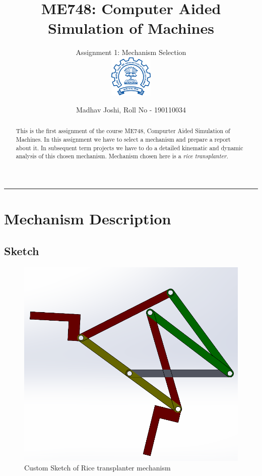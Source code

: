 \documentclass[a4paper,latin,center,onecolumn]{paper}
\title{ME748: Computer Aided Simulation of Machines}
\subtitle{Assignment 1: Mechanism Selection \\
\hfill\includegraphics[height=2cm]{Images/Indian_Institute_of_Technology_Bombay_Logo.png}
\vspace{-2cm}}
\author{Madhav Joshi, Roll No - 190110034}
\begin{document}
    \onecolumn\maketitle 
    \hrule 
    \bigskip

    \begin{abstract}
        This is the first assignment of the course ME748, Compurter Aided Simulation of Machines. In this assignment we have to select a mechanism and prepare a report about it. In subsequent term projects we have to do a detailed kinematic and dynamic analysis of this chosen mechanism. Mechanism chosen here is a \it{rice transplanter}.
    \end{abstract}

    \smalltableofcontents

    \section{Mechanism Description} 
        \subsection{Sketch}
            \begin{figure}[hbt!]
                \centering
                \includegraphics[width=0.9\columnwidth]{Images/Rice_transplanter_1.png}
                \caption{Custom Sketch of Rice transplanter mechanism}
                \label{fig:mySketch}
            \end{figure}
            
\end{document}
